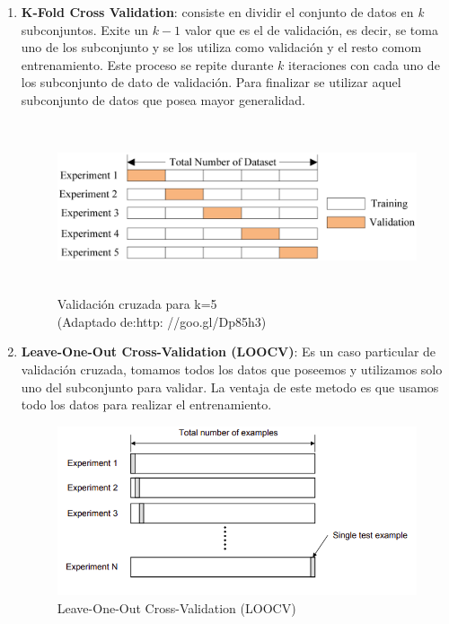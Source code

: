 \begin{enumerate}

\item \textbf{K-Fold Cross Validation}: consiste en dividir el conjunto de datos en \textit{k} subconjuntos. Exite un $k-1 $ valor que es el de validación, es decir, se toma uno de los subconjunto y se los utiliza como validación y el resto comom entrenamiento.  Este proceso se repite durante $k $ iteraciones con cada uno de los subconjunto de dato de validación. Para finalizar se utilizar aquel subconjunto de datos que posea mayor generalidad.
\begin{figure}[H]
 \centering
  \includegraphics[height=5cm,keepaspectratio=true,clip=true]{imagenes/Logos/crossvalidat.png}
  \caption{Validación cruzada para k=5\\(Adaptado de:{http: //goo.gl/Dp85h3})}
	\label{Fig: crossvalidation}
\end{figure}

\item \textbf{Leave-One-Out Cross-Validation (LOOCV)}: Es un caso particular de validación cruzada, tomamos todos los datos que poseemos y utilizamos solo uno del subconjunto para validar. La ventaja de este metodo es que usamos todo los datos para realizar el entrenamiento.

\begin{figure}[H]
 \centering
  \includegraphics[height=5cm,keepaspectratio=true,clip=true]{imagenes/MarcoTeorico/cross-validation-LOOCV.png}
  \caption{Leave-One-Out Cross-Validation (LOOCV)}
	\label{Fig: crossvalidation-LOOCV}
\end{figure}


\end{enumerate}
